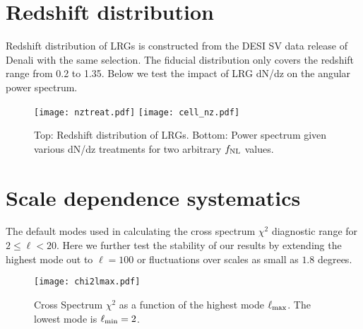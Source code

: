 \section{Redshift distribution}
Redshift distribution of LRGs is constructed from the DESI SV data release of Denali with the same selection. The fiducial distribution only covers the redshift range from 0.2 to 1.35. Below we test the impact of LRG dN/dz on the angular power spectrum.


\begin{figure}
\centering
\texttt{[image: nztreat.pdf]}
\texttt{[image: cell\_nz.pdf]}
\caption{Top: Redshift distribution of LRGs. Bottom: Power spectrum given various dN/dz treatments for two arbitrary $f_{\rm NL}$ values.}
\end{figure}


\section{Scale dependence systematics}
The default modes used in calculating the cross spectrum $\chi^{2}$ diagnostic range for $2 \leq \ell < 20$. Here we further test the stability of our results by extending the highest mode out to $\ell=100$ or fluctuations over scales as small as $1.8$ degrees. 
\begin{figure}
\centering
\texttt{[image: chi2lmax.pdf]}
\caption{Cross Spectrum $\chi^{2}$ as a function of the highest mode $\ell_{\rm max}$. The lowest mode is $\ell_{\rm min}=2$.}
\end{figure}